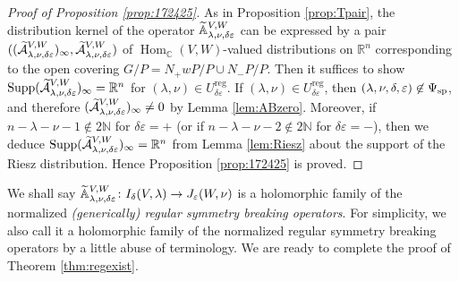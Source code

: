 \begin{proof}[Proof of Proposition \ref{prop:172425}]
As in Proposition \ref{prop:Tpair},
 the distribution kernel of the operator ${\widetilde{\mathbb{A}}}_{{\lambda},{\nu},{\delta\varepsilon}}^{{V,W}}$ can be expressed by 
 a pair $((\widetilde{{\mathcal{A}}}_{{\lambda},{\nu},{\delta\varepsilon}}^{{V,W}})_{\infty}, \widetilde{{\mathcal{A}}}_{{\lambda},{\nu},{\delta\varepsilon}}^{{V,W}})$
 of ${\operatorname{Hom}}_{\mathbb{C}}(V,W)$-valued distributions
 on ${\mathbb{R}}^n$
 corresponding to the open covering
 $G/P=N_+ w P/P \cup N_-P /P$.  
Then it suffices to show 
 ${\operatorname{Supp}}(\widetilde{{\mathcal{A}}}_{{\lambda},{\nu},{\delta\varepsilon}}^{{V,W}})_{\infty}
 ={\mathbb{R}}^n$
 for $(\lambda,\nu)\in U_{\delta\varepsilon}^{{\operatorname{reg}}}$.  
If $(\lambda,\nu) \in U_{\delta\varepsilon}^{{\operatorname{reg}}}$, 
then $(\lambda,\nu,\delta,\varepsilon)\not\in \Psi_{{\operatorname{sp}}}$, 
 and therefore $(\widetilde{{\mathcal{A}}}_{{\lambda},{\nu},{\delta\varepsilon}}^{{V,W}})_{\infty} \ne 0$ by 
 Lemma \ref{lem:ABzero}.  
Moreover,
 if $n-\lambda-\nu-1 \not\in 2{\mathbb{N}}$
 for $\delta \varepsilon =+$
 (or if $n-\lambda-\nu-2 \not\in 2{\mathbb{N}}$
 for $\delta \varepsilon =-$), 
 then we deduce ${\operatorname{Supp}}(\widetilde{{\mathcal{A}}}_{{\lambda},{\nu},{\delta\varepsilon}}^{{V,W}})_{\infty}={\mathbb{R}}^n$ from Lemma \ref{lem:Riesz}
 about the support of the Riesz distribution.  
Hence Proposition \ref{prop:172425} is proved.   
\end{proof}
\begin{definition}
\label{def:AregSBO}
We shall say ${\widetilde{\mathbb{A}}}_{{\lambda},{\nu},{\delta\varepsilon}}^{{V,W}} \colon 
I_{\delta}(V,\lambda) \to J_{\varepsilon}(W,\nu)$ is a holomorphic family
 of the normalized
 {\it{(generically) regular symmetry breaking operators}}.  
For simplicity,
 we also call it a holomorphic family
 of the normalized 
 regular symmetry breaking operators
 by a little abuse of terminology.  
We are ready to complete the proof of Theorem \ref{thm:regexist}.  
\end{definition}
